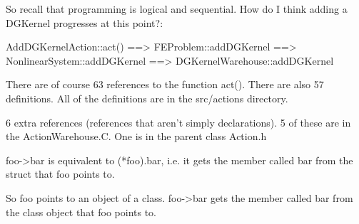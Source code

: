 So recall that programming is logical and sequential. How do I think adding a DGKernel progresses at this point?:

AddDGKernelAction::act() ==> FEProblem::addDGKernel ==> NonlinearSystem::addDGKernel ==> DGKernelWarehouse::addDGKernel

There are of course 63 references to the function act(). There are also 57 definitions. All of the definitions are in the src/actions directory.

6 extra references (references that aren't simply declarations). 5 of these are in the ActionWarehouse.C. One is in the parent class Action.h

foo->bar is equivalent to (*foo).bar, i.e. it gets the member called bar from the struct that foo points to.

So foo points to an object of a class. foo->bar gets the member called bar from the class object that foo points to.

